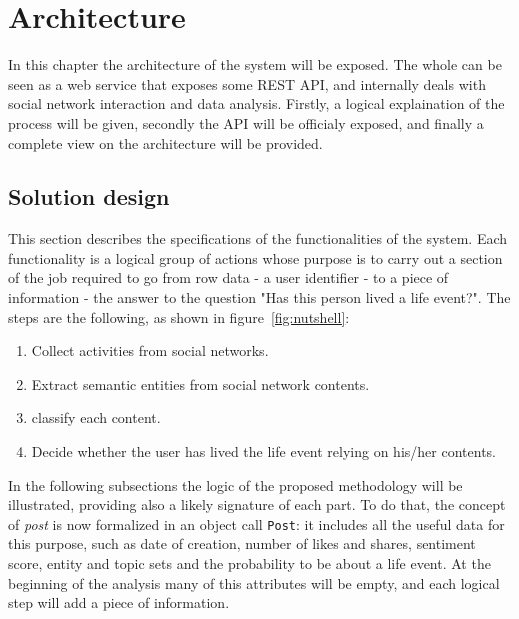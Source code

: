 \chapter{Architecture}
\label{cha:architecture}

In this chapter the architecture of the system will be exposed. The whole can be seen as a web service that exposes some REST API, and internally deals with social network interaction and data analysis. Firstly, a logical explaination of the process will be given, secondly the API will be officialy exposed, and finally a complete view on the architecture will be provided.

\section{Solution design}
\label{sec:design}
This section describes the specifications of the functionalities of the system. Each functionality is a logical group of actions whose purpose is to carry out a section of the job required to go from row data - a user identifier - to a piece of information - the answer to the question "Has this person lived a life event?". The steps are the following, as shown in figure~\ref{fig:nutshell}:
\begin{enumerate}
\item Collect activities from social networks.
\item Extract semantic entities from social network contents.
\item classify each content.
\item Decide whether the user has lived the life event relying on his/her contents.
\end{enumerate}
In the following subsections the logic of the proposed methodology will be illustrated, providing also a likely signature of each part. To do that, the concept of \textit{post} is now formalized in an object call \texttt{Post}: it includes all the useful data for this purpose, such as date of creation, number of likes and shares, sentiment score, entity and topic sets and the probability to be about a life event. At the beginning of the analysis many of this attributes will be empty, and each logical step will add a piece of information.\\

